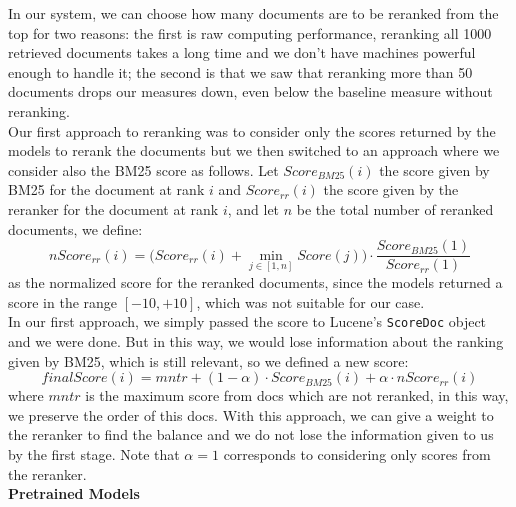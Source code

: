 In our system, we can choose how many documents are to be reranked from the top for two reasons: the first is raw computing performance, reranking all 1000 retrieved documents takes a long time and we don't have machines powerful enough to handle it; the second is that we saw that reranking more than 50 documents drops our measures down, even below the baseline measure without reranking.\\
Our first approach to reranking was to consider only the scores returned by the models to rerank the documents but we then switched to an approach where we consider also the BM25 score as follows. Let $Score_{BM25}(i)$ the score given by BM25 for the document at rank $i$ and $Score_{rr}(i)$ the score given by the reranker for the document at rank $i$, and let $n$ be the total number of reranked documents, we define: 
\begin{equation}
nScore_{rr}(i) = \bigg(Score_{rr}(i)+\min_{j\in [1,n]}Score(j)\bigg)\cdot \frac{Score_{BM25}(1)}{Score_{rr}(1)}
\end{equation}
as the normalized score for the reranked documents, since the models returned a score in the range $[-10,+10]$, which was not suitable for our case.\\
In our first approach, we simply passed the score to Lucene's \texttt{ScoreDoc} object and we were done. But in this way, we would lose information about the ranking given by BM25, which is still relevant, so we defined a new score: 
\begin{equation}
finalScore(i) = mntr + (1-\alpha)\cdot Score_{BM25}(i)+\alpha\cdot nScore_{rr}(i)
\end{equation}
where $mntr$ is the maximum score from docs which are not reranked, in this way, we preserve the order of this docs. With this approach, we can give a weight to the reranker to find the balance and we do not lose the information given to us by the first stage. Note that $\alpha=1$ corresponds to considering only scores from the reranker. \\

\noindent \textbf{Pretrained Models}


